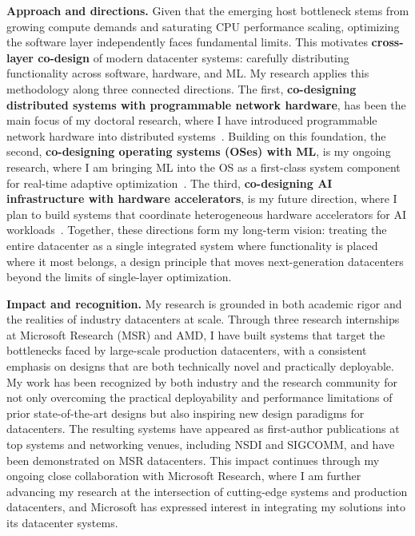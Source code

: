 \documentclass[11pt,letterpaper]{article}
\newcommand{\keyterm}[1]{\textbf{\color{darkgray}#1}}
\begin{document}
\textbf{Approach and directions.} Given that the emerging host bottleneck stems from growing compute demands and saturating CPU performance scaling, optimizing the software layer independently faces fundamental limits. This motivates \keyterm{cross-layer co-design} of modern datacenter systems: carefully distributing functionality across software, hardware, and ML. My research applies this methodology along three connected directions. The first, \keyterm{co-designing distributed systems with programmable network hardware}, has been the main focus of my doctoral research, where I have introduced programmable network hardware into distributed systems~\cite{hydra, conweave, capybara_apsys, capybara_sigcomm}. Building on this foundation, the second, \keyterm{co-designing operating systems (OSes) with ML}, is my ongoing research, where I am bringing ML into the OS as a first-class system component for real-time adaptive optimization~\cite{autokernel}. The third, \keyterm{co-designing AI infrastructure with hardware accelerators}, is my future direction, where I plan to build systems that coordinate heterogeneous hardware accelerators for AI workloads~\cite{reconic}.
Together, these directions form my long-term vision: treating the entire datacenter as a single integrated system where functionality is placed where it most belongs, a design principle that moves next-generation datacenters beyond the limits of single-layer optimization.

\textbf{Impact and recognition.}
My research is grounded in both academic rigor and the realities of industry datacenters at scale.
Through three research internships at Microsoft Research (MSR) and AMD, I have built systems that target the bottlenecks faced by large-scale production datacenters, with a consistent emphasis on designs that are both technically novel and practically deployable.
My work has been recognized by both industry and the research community for not only overcoming the practical deployability and performance limitations of prior state-of-the-art designs but also inspiring new design paradigms for datacenters.
The resulting systems have appeared as first-author publications at top systems and networking venues, including NSDI and SIGCOMM, and have been demonstrated on MSR datacenters.
This impact continues through my ongoing close collaboration with Microsoft Research, where I am further advancing my research at the intersection of cutting-edge systems and production datacenters, and Microsoft has expressed interest in integrating my solutions into its datacenter systems.
\end{document}
